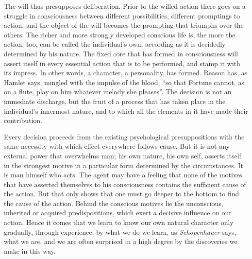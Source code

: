 \documentclass[12pt,a4paper,openany]{book}
\newcommand{\opage}[1]{\marginnote{\footnotesize\textit{[#1]}}}
\begin{document}
The will thus presupposes deliberation. Prior to the willed action there goes
on a struggle in consciousness between different possibilities, different
promptings to action, and the object of the will becomes the prompting that
triumphs over the others. The richer and more strongly developed conscious
life is, the more the action, too, can be called the individual's own,
according as it is decidedly determined by his nature. The fixed core that has
formed in consciousness will assert itself in every essential action that is
to be performed, and stamp it with its impress. In other words, a character, a
personality, has formed. Reason has, as Hamlet says, mingled with the impulse
of the blood, ``so that Fortune cannot, as on a flute, play on him whatever
melody she pleases''. The decision is not an immediate discharge, but the
fruit of a process that has taken place in the individual's innermost nature,
and to which all the elements in it have made their contribution.

Every decision proceeds from the \opage{117}existing psychological
presuppositions with the same necessity with which effect everywhere follows
cause. But it is not any external power that overwhelms man; his own nature,
his own self, asserts itself in the strongest motive in a particular form
determined by the circumstances. It is man himself who acts. The agent may
have a feeling that none of the motives that have asserted themselves to his
consciousness contains the sufficient cause of the action. But that only shows
that one must go deeper to the bottom to find the cause of the action. Behind
the conscious motives lie the unconscious, inherited or acquired
predispositions, which exert a decisive influence on our action. Hence it
comes that we learn to know our own natural character only gradually, through
experience; by what we do we learn, as \emph{Schopenhauer} says, what we are,
and we are often surprised in a high degree by the discoveries we make in this
way.
\end{document}
